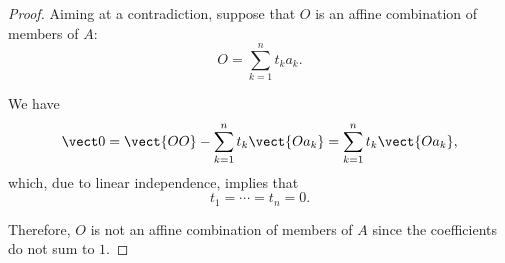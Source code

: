 \begin{proof}
  Aiming at a contradiction, suppose that \( O \) is an affine combination of members of \( A \):
  \begin{equation*}
    O = \sum_{k=1}^n t_k a_k.
  \end{equation*}

  We have
  \begin{equation*}
    \vect 0
    =
    \vect{O O} - \sum_{k=1}^n t_k \vect {O a_k}
    =
    \sum_{k=1}^n t_k \vect{O a_k},
  \end{equation*}
  which, due to linear independence, implies that
  \begin{equation*}
    t_1 = \cdots = t_n = 0.
  \end{equation*}

  Therefore, \( O \) is not an affine combination of members of \( A \) since the coefficients do not sum to \( 1 \).
\end{proof}


